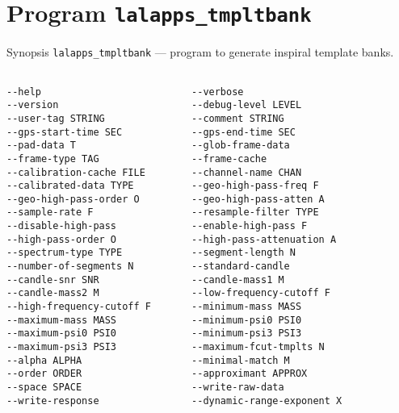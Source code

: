 \section{Program \texttt{lalapps\_tmpltbank}}
\label{program:lalapps-tmpltbank}
\begin{entry}
\item[Synopsis]
\noindent \verb$lalapps_tmpltbank$ --- program to generate inspiral template banks.
\begin{verbatim}

--help                          --verbose                   
--version                       --debug-level LEVEL      
--user-tag STRING               --comment STRING       
--gps-start-time SEC            --gps-end-time SEC  
--pad-data T                    --glob-frame-data         
--frame-type TAG                --frame-cache          
--calibration-cache FILE        --channel-name CHAN          
--calibrated-data TYPE          --geo-high-pass-freq F   
--geo-high-pass-order O         --geo-high-pass-atten A  
--sample-rate F                 --resample-filter TYPE      	
--disable-high-pass             --enable-high-pass F         
--high-pass-order O             --high-pass-attenuation A   
--spectrum-type TYPE            --segment-length N      
--number-of-segments N          --standard-candle           
--candle-snr SNR                --candle-mass1 M             
--candle-mass2 M                --low-frequency-cutoff F     
--high-frequency-cutoff F       --minimum-mass MASS        
--maximum-mass MASS             --minimum-psi0 PSI0          
--maximum-psi0 PSI0             --minimum-psi3 PSI3          
--maximum-psi3 PSI3             --maximum-fcut-tmplts N    
--alpha ALPHA                   --minimal-match M       
--order ORDER                   --approximant APPROX          
--space SPACE                   --write-raw-data           
--write-response                --dynamic-range-exponent X  

\end{verbatim}


\end{entry}
